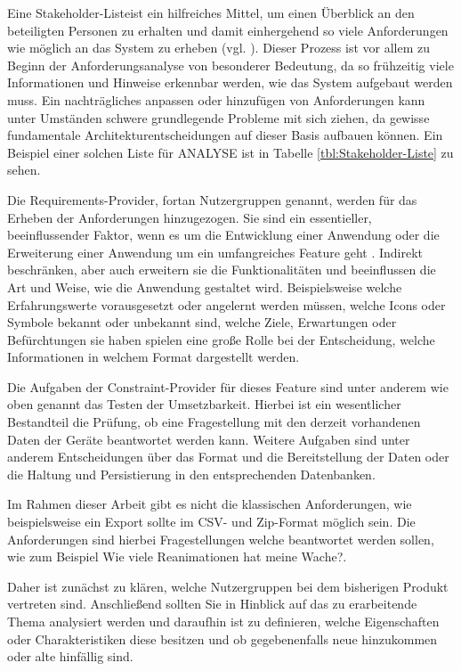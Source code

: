 Eine \glqq Stakeholder-Liste\grqq ist ein hilfreiches Mittel, um einen Überblick an den beteiligten Personen zu erhalten und damit einhergehend so viele Anforderungen wie möglich an das System zu erheben (vgl. \cite[S. 83]{Bergsmann.2018}).
Dieser Prozess ist vor allem zu Beginn der Anforderungsanalyse von besonderer Bedeutung, da so frühzeitig viele Informationen und Hinweise erkennbar werden, wie das System aufgebaut werden muss.
Ein nachträgliches anpassen oder hinzufügen von Anforderungen kann unter Umständen schwere grundlegende Probleme mit sich ziehen, da gewisse fundamentale Architekturentscheidungen auf dieser Basis aufbauen können.
Ein Beispiel einer solchen Liste für \gls{ANALYSE} ist in Tabelle \ref{tbl:Stakeholder-Liste} zu sehen.

Die Requirements-Provider, fortan Nutzergruppen genannt, werden für das Erheben der Anforderungen hinzugezogen.
Sie sind ein essentieller, beeinflussender Faktor, wenn es um die Entwicklung einer Anwendung oder die Erweiterung einer Anwendung um ein umfangreiches Feature geht \cite[S. 125]{Herczeg.2018}.
Indirekt beschränken, aber auch erweitern sie die Funktionalitäten und beeinflussen die Art und Weise, wie die Anwendung gestaltet wird. 
Beispielsweise welche Erfahrungswerte vorausgesetzt oder angelernt werden müssen, welche Icons oder Symbole bekannt oder unbekannt sind, welche Ziele, Erwartungen oder Befürchtungen sie haben spielen eine große Rolle bei der Entscheidung, welche Informationen in welchem Format dargestellt werden.

Die Aufgaben der Constraint-Provider für dieses \gls{Feature} sind unter anderem wie oben genannt das Testen der Umsetzbarkeit.
Hierbei ist ein wesentlicher Bestandteil die Prüfung, ob eine Fragestellung mit den derzeit vorhandenen Daten der Geräte beantwortet werden kann.
Weitere Aufgaben sind unter anderem Entscheidungen über das Format und die Bereitstellung der Daten oder die Haltung und Persistierung in den entsprechenden Datenbanken.

Im Rahmen dieser Arbeit gibt es nicht die klassischen Anforderungen, wie beispielsweise \glqq ein Export sollte im CSV- und Zip-Format möglich sein\grqq. Die Anforderungen sind hierbei Fragestellungen welche beantwortet werden sollen, wie zum Beispiel \glqq Wie viele Reanimationen hat meine Wache?\grqq.

Daher ist zunächst zu klären, welche Nutzergruppen bei dem bisherigen Produkt vertreten sind.
Anschließend sollten Sie in Hinblick auf das zu erarbeitende Thema analysiert werden und daraufhin ist zu definieren, welche Eigenschaften oder Charakteristiken diese besitzen und ob gegebenenfalls neue hinzukommen oder alte hinfällig sind. 


